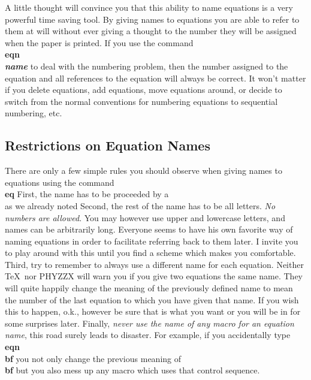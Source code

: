 A little thought will convince you that this ability to name
equations is a very powerful time saving tool.
By giving names to equations you are able to refer to them
at will without ever giving a thought to the number they
will be assigned when the paper is printed.
If you use the command {\bf \\eqn\\{\it name}} to
deal with the numbering problem, then the number assigned to the
equation and all references to the equation will always be correct.
It won't matter if you delete equations, add equations, move
equations around, or decide to switch from the normal conventions
for numbering equations to sequential numbering, etc.
 
\subsection{Restrictions on Equation Names}
 
There are only a few simple rules you should observe when giving
names to equations using the command {\bf \\eq}
\pointbegin
First, the name has to be proceeded by a \\ as we already noted
\point
Second, the rest of the name has to be all letters.
{\it No numbers are allowed\/}.
You may however use upper and lowercase letters, and names can
be arbitrarily long.
Everyone seems to have his own favorite way of naming equations
in order to facilitate referring back to them later.
I invite you to play around with this until you find a scheme
which makes you comfortable.
\point
Third, try to remember to always use a different name for each
equation.
Neither \TeX\ nor PHYZZX will warn you if you give two equations
the same name.
They will quite happily change the meaning of the
previously defined name to mean the number of the last equation
to which you have given that name.
If you wish this to happen, o.k., however be sure that is what you
want or you will be in for some surprises later.
\point
Finally, {\it never use the name of any macro for an equation name},
this road surely leads to disaster.
For example, if you accidentally type {\bf \\eqn\\bf}
you not only change the previous meaning of {\bf \\bf} but you
also mess up any macro which uses that control sequence.
 
